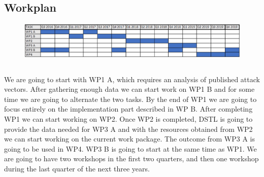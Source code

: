 \documentclass[a4paper,11pt]{article}
\begin{document}
\newpage
\begin{landscape}
\section*{Workplan}

\begin{figure}[h]
\centering
\includegraphics[width=25cm]{gantt.png}
\end{figure}

\subsection*{}

We are going to start with WP1 A, which requires an analysis of published attack vectors. After gathering enough data we can start work on WP1 B and for some time we are going to alternate the two tasks. By the end of WP1 we are going to focus entirely on the implementation part described in WP B. After completing WP1 we can start working on WP2. Once WP2 is completed, DSTL is going to provide the data needed for WP3 A and with the resources obtained from WP2 we can start working on the current work package. The outcome from WP3 A is going to be used in WP4. WP3 B is going to start at the same time as WP1. We are going to have two workshops in the first two quarters, and then one workshop during the last quarter of the next three years.

\end{landscape}
\end{document}
